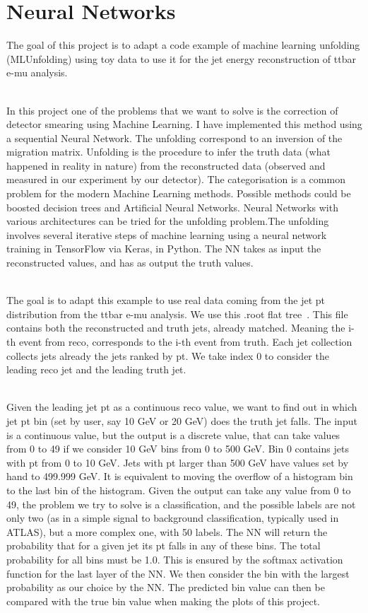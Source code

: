 \section{Neural Networks}
\label{sec:NeuralNetworks}

The goal of this project is to adapt a code example of machine learning unfolding (MLUnfolding) using toy data to use it for the jet energy reconstruction of ttbar e-mu analysis.

\ \\In this project one of the problems that we want to solve is the correction of detector smearing using Machine Learning. I have implemented this method using a sequential Neural Network. The unfolding correspond to an inversion of the migration matrix. Unfolding is the procedure to infer the truth data (what happened in reality in nature) from the reconstructed data (observed and measured in our experiment by our detector). The categorisation is a common problem for the modern Machine Learning methods. Possible methods could be boosted decision trees and Artificial Neural Networks. Neural Networks with various architectures can be tried for the unfolding problem.The unfolding involves several iterative steps of machine learning using a neural network training in TensorFlow via Keras, in Python. The NN takes as input the reconstructed values, and has as output the truth values.

\ \\The goal is to adapt this example to use real data coming from the jet pt distribution from the ttbar e-mu analysis. We use this .root flat tree~\cite{RootFile}.
This file contains both the reconstructed and truth jets, already matched. Meaning the i-th event from reco, corresponds to the i-th event from truth. Each jet collection collects jets already the jets ranked by pt. We take index 0 to consider the leading reco jet and the leading truth jet.

\ \\Given the leading jet pt as a continuous reco value, we want to find out in which jet pt bin (set by user, say 10 GeV or 20 GeV) does the truth jet falls. The input is a continuous value, but the output is a discrete value, that can take values from 0 to 49 if we consider 10 GeV bins from 0 to 500 GeV. Bin 0 contains jets with pt from 0 to 10 GeV. Jets with pt larger than 500 GeV have values set by hand to 499.999 GeV. It is equivalent to moving the overflow of a histogram bin to the last bin of the histogram. Given the output can take any value from 0 to 49, the problem we try to solve is a classification, and the possible labels are not only two (as in a simple signal to background classification, typically used in ATLAS), but a more complex one, with 50 labels. The NN will return the probability that for a given jet its pt falls in any of these bins. The total probability for all bins must be 1.0. This is ensured by the softmax activation function for the last layer of the NN. We then consider the bin with the largest probability as our choice by the NN. The predicted bin value can then be compared with the true bin value when making the plots of this project.

